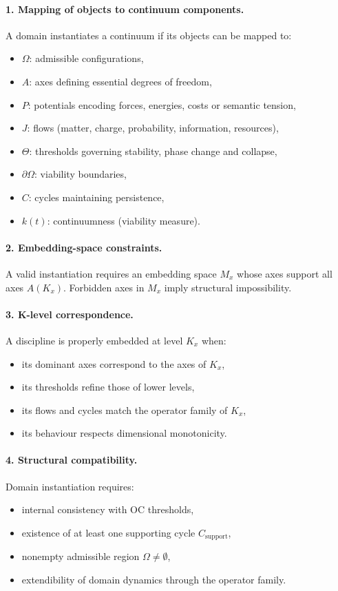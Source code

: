 \paragraph{1. Mapping of objects to continuum components.}
A domain instantiates a continuum if its objects can be mapped to:
\begin{itemize}
  \item \(\Omega\): admissible configurations,
  \item \(A\): axes defining essential degrees of freedom,
  \item \(P\): potentials encoding forces, energies, costs or semantic tension,
  \item \(J\): flows (matter, charge, probability, information, resources),
  \item \(\Theta\): thresholds governing stability, phase change and collapse,
  \item \(\partial\Omega\): viability boundaries,
  \item \(C\): cycles maintaining persistence,
  \item \(k(t)\): continuumness (viability measure).
\end{itemize}

\paragraph{2. Embedding-space constraints.}
A valid instantiation requires an embedding space \(M_x\) whose axes support
all axes \(A(K_x)\). Forbidden axes in \(M_x\) imply structural impossibility.

\paragraph{3. K-level correspondence.}
A discipline is properly embedded at level \(K_x\) when:
\begin{itemize}
  \item its dominant axes correspond to the axes of \(K_x\),
  \item its thresholds refine those of lower levels,
  \item its flows and cycles match the operator family of \(K_x\),
  \item its behaviour respects dimensional monotonicity.
\end{itemize}

\paragraph{4. Structural compatibility.}
Domain instantiation requires:
\begin{itemize}
  \item internal consistency with OC thresholds,
  \item existence of at least one supporting cycle \(C_{\mathrm{support}}\),
  \item nonempty admissible region \(\Omega\neq\emptyset\),
  \item extendibility of domain dynamics through the operator family.
\end{itemize}

